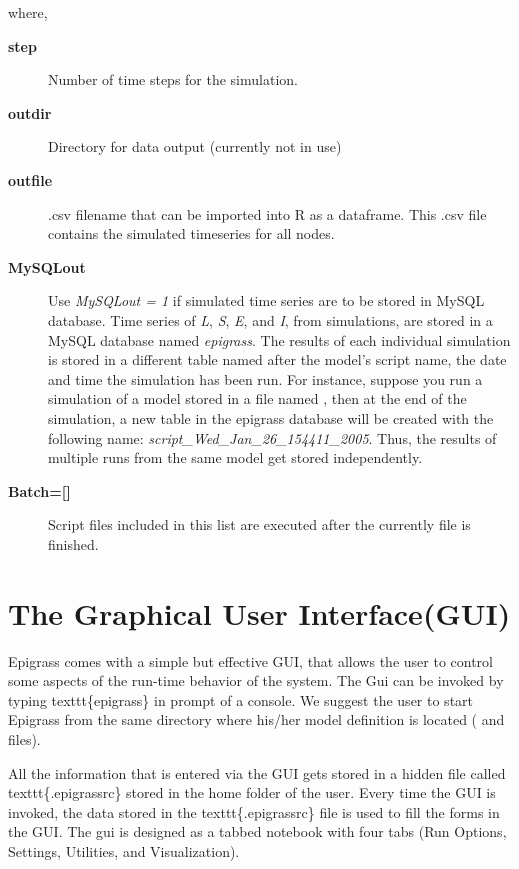 \documentclass[a4paper,10pt]{manual}
\begin{document}
where,
\begin{description}
\item[\textbf{step}]
Number of time steps for the simulation.

\item[\textbf{outdir}]
Directory for data output (currently not in use)

\item[\textbf{outfile}]
.csv filename that can be imported into R as a dataframe. This .csv file contains the simulated timeseries for all nodes.

\item[\textbf{MySQLout}]
Use \emph{MySQLout = 1} if simulated time series are to be stored in MySQL database. Time series of \emph{L}, \emph{S}, \emph{E}, and \emph{I}, from simulations, are stored in a MySQL database named \emph{epigrass}. The results of each individual simulation is stored in a different table named after the model's script name, the date and time the simulation has been run. For instance, suppose you run a simulation of a model stored in a file named , then at the end of the simulation, a new table in the epigrass database will be created with the following name: \emph{script\_Wed\_Jan\_26\_154411\_2005}. Thus, the results of multiple runs from the same model get stored independently.

\item[\textbf{Batch={[}{]}}]
Script files included in this list are executed after the currently file is finished.

\end{description}


\section{The Graphical User Interface(GUI)}

Epigrass comes with a simple but effective GUI, that allows the user to control some aspects of the run-time behavior of the system. The Gui can be invoked by typing texttt\{epigrass\} in prompt of a console. We suggest the user to start Epigrass from the same directory where his/her model definition is located ( and    files).

All the information that is entered via the GUI gets  stored in a hidden file called texttt\{.epigrassrc\} stored in the home folder of the user. Every time the GUI is invoked, the data stored in the texttt\{.epigrassrc\} file is used to fill the forms in the GUI. The gui is designed as a tabbed notebook with four tabs (Run Options, Settings, Utilities, and Visualization).
\end{document}
